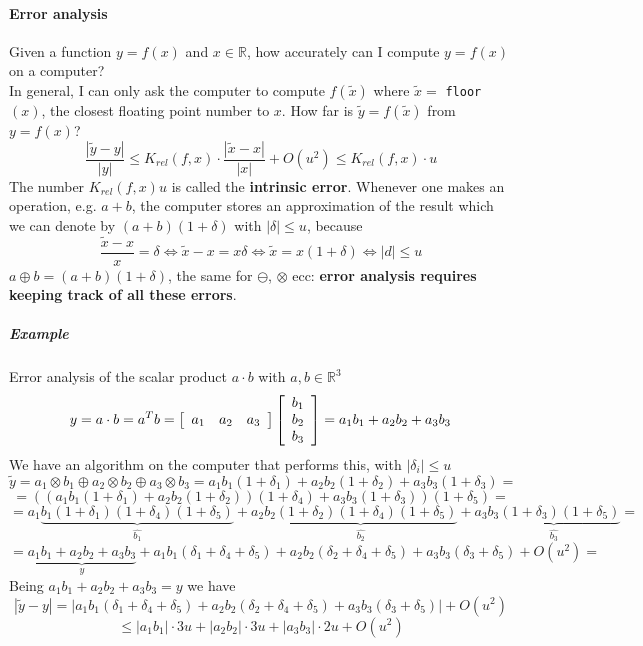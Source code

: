 \documentclass[10pt]{report}
\begin{document}
\paragraph{Error analysis} Given a function $y = f(x)$ and $x\in \mathbb{R}$, how accurately can I compute $y=f(x)$ on a computer?\\
In general, I can only ask the computer to compute $f(\tilde{x})$ where $\tilde{x} =$ \texttt{floor}$(x)$, the closest floating point number to $x$. How far is $\tilde{y}=f(\tilde{x})$ from $y=f(x)$?
$$\frac{|\tilde{y}-y|}{|y|}\leq K_{rel}(f,x)\cdot\frac{|\tilde{x}-x|}{|x|} + O(u^2)\leq K_{rel}(f,x)\cdot u$$
The number $K_{rel}(f,x)u$ is called the \textbf{intrinsic error}. Whenever one makes an operation, e.g. $a+b$, the computer stores an approximation of the result which we can denote by $(a+b)(1+\delta)$ with $|\delta|\leq u$, because $$\frac{\tilde{x}-x}{x} = \delta \Leftrightarrow \tilde{x} - x = x\delta \Leftrightarrow \tilde{x} = x(1+\delta) \Leftrightarrow |d|\leq u$$
$a\oplus b = (a+b)(1+\delta)$, the same for $\ominus$, $\otimes$ ecc: \textbf{error analysis requires keeping track of all these errors}.
\subparagraph{Example} Error analysis of the scalar product $a\cdot b$ with $a,b \in \mathbb{R}^3$
$$y = a\cdot b = a^Tb = \left[\begin{array}{c c c}
a_1 & a_2 & a_3
\end{array}\right] \left[\begin{array}{c}
b_1\\b_2\\b_3
\end{array}\right]=a_1b_1+a_2b_2+a_3b_3$$
We have an algorithm on the computer that performs this, with $|\delta_i|\leq u$ $$\tilde{y} = a_1\otimes b_1\oplus a_2\otimes b_2\oplus a_3\otimes b_3 = a_1b_1(1+\delta_1)+a_2b_2(1+\delta_2)+a_3b_3(1+\delta_3) = $$
$$ = \left((a_1b_1(1+\delta_1) + a_2b_2(1+\delta_2)) (1+\delta_4) + a_3b_3(1+\delta_3)\right)(1+\delta_5) =$$
$$ = a_1\underset{\hat{b_1}}{\underbrace{b_1(1+\delta_1)(1+\delta_4)(1+\delta_5)}} + a_2\underset{\hat{b_2}}{\underbrace{b_2(1+\delta_2)(1+\delta_4)(1+\delta_5)}} + a_3\underset{\hat{b_3}}{\underbrace{b_3(1+\delta_3)(1+\delta_5)}} = $$
$$ = \underset{y}{\underbrace{a_1b_1+a_2b_2+a_3b_3}} + a_1b_1(\delta_1+\delta_4+\delta_5) + a_2b_2(\delta_2+\delta_4+\delta_5) + a_3b_3(\delta_3+\delta_5) + O(u^2) = $$
Being $a_1b_1+a_2b_2+a_3b_3 = y$ we have 
$$|\tilde{y} - y| = |a_1b_1(\delta_1+\delta_4+\delta_5) + a_2b_2(\delta_2+\delta_4+\delta_5) + a_3b_3(\delta_3+\delta_5)| + O(u^2)$$
$$\leq |a_1b_1|\cdot3u + |a_2b_2|\cdot3u + |a_3b_3|\cdot2u + O(u^2)$$
\end{document}
